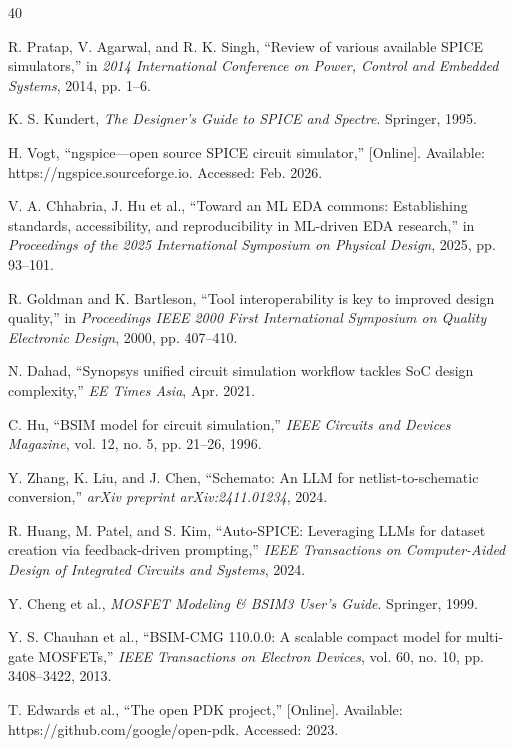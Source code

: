 \documentclass[10pt,twocolumn]{article}
\begin{document}

\begin{thebibliography}{40}

 R. Pratap, V. Agarwal, and R. K. Singh, ``Review of various available SPICE simulators,'' in \textit{2014 International Conference on Power, Control and Embedded Systems}, 2014, pp. 1--6.

 K. S. Kundert, \textit{The Designer's Guide to SPICE and Spectre}. Springer, 1995.

 H. Vogt, ``ngspice---open source SPICE circuit simulator,'' [Online]. Available: https://ngspice.sourceforge.io. Accessed: Feb. 2026.

 V. A. Chhabria, J. Hu et al., ``Toward an ML EDA commons: Establishing standards, accessibility, and reproducibility in ML-driven EDA research,'' in \textit{Proceedings of the 2025 International Symposium on Physical Design}, 2025, pp. 93--101.

 R. Goldman and K. Bartleson, ``Tool interoperability is key to improved design quality,'' in \textit{Proceedings IEEE 2000 First International Symposium on Quality Electronic Design}, 2000, pp. 407--410.

 N. Dahad, ``Synopsys unified circuit simulation workflow tackles SoC design complexity,'' \textit{EE Times Asia}, Apr. 2021.

 C. Hu, ``BSIM model for circuit simulation,'' \textit{IEEE Circuits and Devices Magazine}, vol. 12, no. 5, pp. 21--26, 1996.

 Y. Zhang, K. Liu, and J. Chen, ``Schemato: An LLM for netlist-to-schematic conversion,'' \textit{arXiv preprint arXiv:2411.01234}, 2024.

 R. Huang, M. Patel, and S. Kim, ``Auto-SPICE: Leveraging LLMs for dataset creation via feedback-driven prompting,'' \textit{IEEE Transactions on Computer-Aided Design of Integrated Circuits and Systems}, 2024.

 Y. Cheng et al., \textit{MOSFET Modeling \& BSIM3 User's Guide}. Springer, 1999.

 Y. S. Chauhan et al., ``BSIM-CMG 110.0.0: A scalable compact model for multi-gate MOSFETs,'' \textit{IEEE Transactions on Electron Devices}, vol. 60, no. 10, pp. 3408--3422, 2013.

 T. Edwards et al., ``The open PDK project,'' [Online]. Available: https://github.com/google/open-pdk. Accessed: 2023.


\end{thebibliography}
\end{document}
